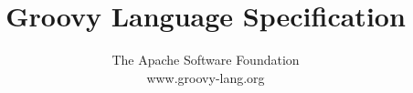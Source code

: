\documentclass[10pt,letterpaper]{book}
\begin{document}
\let\footnoterule\hrule

\makeatletter
\renewcommand{\@makefntext}[1]%
	{\noindent\makebox[1.8em][r]{\@makefnmark}#1}
\makeatother

\title{
	Groovy Language Specification
}

\author{
	\textsf{The Apache Software Foundation}\\
	\textsf{www.groovy-lang.org}\\
}


\frontmatter

\maketitle

\tableofcontents

\listoffigures 



\mainmatter







\appendix




\backmatter



\small
\printindex
\end{document}

